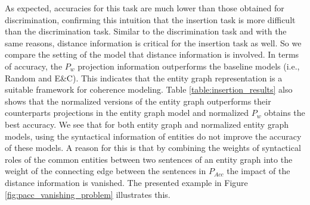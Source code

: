 As expected, accuracies for this task are much lower than those obtained for discrimination, confirming this intuition that the insertion task is more difficult than the discrimination task. 
Similar to the discrimination task and with the same reasons, distance information is critical for the insertion task as well. 
So we compare the setting of the model that distance information is involved. 
In terms of accuracy, the $P_w$ projection information outperforms the baseline models (i.e., Random and E\&C). 
This indicates that the entity graph representation is a suitable framework for coherence modeling. 
Table  \ref{table:insertion_results} also shows that the normalized versions of the entity graph outperforms their counterparts projections in the entity graph model and normalized $P_w$ obtains the best accuracy. 
We see that for both entity graph and normalized entity graph models, using the syntactical information of entities do not improve the accuracy of these models. 
A reason for this is that by combining the weights of syntactical roles of the common entities between two sentences of an entity graph into the weight of the connecting edge between the sentences in $P_{Acc}$ the impact of the distance information is vanished.  
The presented example in Figure \ref{fig:pacc_vanishing_problem} illustrates this. 

